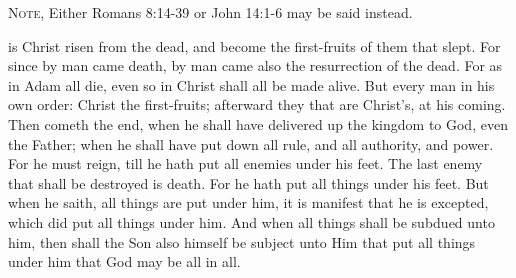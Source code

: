 \begin{rubric}
	\textsc{Note,} Either Romans 8:14-39 or John 14:1-6 may be said instead.
\end{rubric}
 is Christ risen from the dead, and become the first-fruits of them that slept. For since by man came death, by man came also the resurrection of the dead. For as in Adam all die, even so in Christ shall all be made alive. But every man in his own order: Christ the first-fruits; afterward they that are Christ's, at his coming. Then cometh the end, when he shall have delivered up the kingdom to God, even the Father; when he shall have put down all rule, and all authority, and power. For he must reign, till he hath put all enemies under his feet. The last enemy that shall be destroyed is death. For he hath put all things under his feet. But when he saith, all things are put under him, it is manifest that he is excepted, which did put all things under him. And when all things shall be subdued unto him, then shall the Son also himself be subject unto Him that put all things under him that God may be all in all.\par
